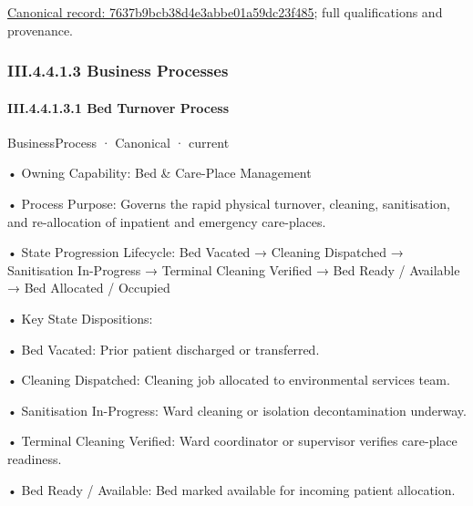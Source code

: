 {\footnotesize \href{../../../../continuum/business/business-function/7637b9bcb38d4e3abbe01a59dc23f485.md}{Canonical record: 7637b9bcb38d4e3abbe01a59dc23f485}; full qualifications and provenance.}\par
\subsubsection*{III.4.4.1.3 Business Processes}
\label{navigation:III.4.4.1.3}

\paragraph*{III.4.4.1.3.1 Bed Turnover Process}
\label{navigation:III.4.4.1.3.1}

\label{element:69f74289926942f4baed4acf4c654a3b}
{\small BusinessProcess · Canonical · current}\par

•
Owning Capability: Bed \& Care-Place Management



•
Process Purpose: Governs the rapid physical turnover, cleaning, sanitisation, and re-allocation of inpatient and emergency care-places.



•
State Progression Lifecycle: Bed Vacated → Cleaning Dispatched → Sanitisation In-Progress → Terminal Cleaning Verified → Bed Ready / Available → Bed Allocated / Occupied



•
Key State Dispositions:



•
Bed Vacated: Prior patient discharged or transferred.



•
Cleaning Dispatched: Cleaning job allocated to environmental services team.



•
Sanitisation In-Progress: Ward cleaning or isolation decontamination underway.



•
Terminal Cleaning Verified: Ward coordinator or supervisor verifies care-place readiness.



•
Bed Ready / Available: Bed marked available for incoming patient allocation.



